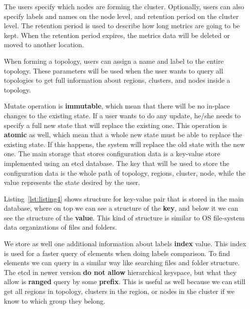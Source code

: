 The users specify which nodes are forming the cluster. Optionally, users can also specify labels and names on the node level, and retention period on the cluster level. The retention period is used to describe how long metrics are going to be kept. When the retention period expires, the metrics data will be deleted or moved to another location. 

When forming a topology, users can assign a name and label to the entire topology. These parameters will be used when the user wants to query all topologies to get full information about regions, clusters, and nodes inside a topology.

Mutate operation is \textbf{immutable}, which mean that there will be no in-place changes to the existing state. If a user wants to do any update, he/she needs to specify a full new state that will replace the existing one. This operation is \textbf{atomic} as well, which mean that a whole new state must be able to replace the existing state. If this happens, the system will replace the old state with the new one. The main storage that stores configuration data is a key-value store implemented using an etcd database. The key that will be used to store the configuration data is the whole path of topology, regions, cluster, node, while the value represents the state desired by the user. 

Listing~\ref{lst:listing4} shows structure for key-value pair that is stored in the main database, where on top we can see a structure of the \textbf{key}, and below it we can see the structure of the \textbf{value}. This kind of structure is similar to OS file-system data organizations of files and folders.



\noindent
We store as well one additional information about labels \textbf{index} value. This index is used for a faster query of elements when doing labels comparison. To find elements we can query in a similar way like searching files and folder structure. The etcd in newer version \textbf{do not allow} hierarchical keyspace, but what they allow is \textbf{ranged} query by some \textbf{prefix}. This is useful as well because we can still get all regions in topology, clusters in the region, or nodes in the cluster if we know to which group they belong.

